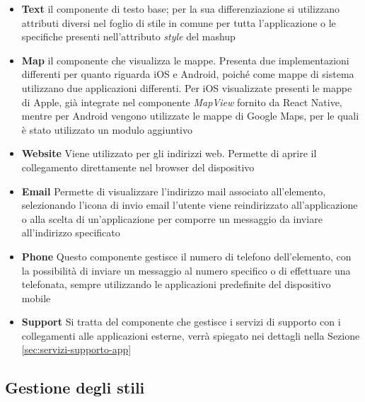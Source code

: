 \begin{itemize}
	\item \textbf{Text}
	\upe il componente di testo base; per la sua differenziazione si utilizzano attributi diversi nel foglio di stile in comune per tutta l'applicazione o le specifiche presenti nell'attributo \emph{style} del mashup
	\item \textbf{Map}
	\upe il componente che visualizza le mappe. Presenta due implementazioni differenti per quanto riguarda iOS e Android, poiché come mappe di sistema utilizzano due applicazioni differenti. Per iOS visualizzate presenti le mappe di Apple, già integrate nel componente \emph{MapView} fornito da React Native, mentre per Android vengono utilizzate le mappe di Google Maps, per le quali è stato utilizzato un modulo aggiuntivo
	\item \textbf{Website}
	Viene utilizzato per gli indirizzi web. Permette di aprire il collegamento direttamente nel browser del dispositivo
	\item \textbf{Email}
	Permette di visualizzare l'indirizzo mail associato all'elemento, selezionando l'icona di invio email l'utente viene reindirizzato all'applicazione o alla scelta di un'applicazione per comporre un messaggio da inviare all'indirizzo specificato
	\item \textbf{Phone}
	Questo componente gestisce il numero di telefono dell'elemento, con la possibilità di inviare un messaggio al numero specifico o di effettuare una telefonata, sempre utilizzando le applicazioni predefinite del dispositivo mobile
	\item \textbf{Support}
	Si tratta del componente che gestisce i servizi di supporto con i collegamenti alle applicazioni esterne, verrà spiegato nei dettagli nella Sezione \ref{sec:servizi-supporto-app}
\end{itemize}

\subsection{Gestione degli stili}

